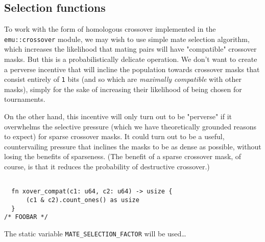 \documentclass[11pt]{article}
\begin{document}
\subsection{Selection functions}
\label{sec:org14164e5}

To work with the form of homologous crossover implemented in the
\texttt{emu::crossover} module, we may wish to use simple mate selection
algorithm, which increases the likelihood that mating pairs will
have "compatible" crossover masks. But this is a probabilistically
delicate operation. We don't want to create a perverse incentive
that will incline the population towards crossover masks that consist
entirely of \texttt{1} bits (and so which are \emph{maximally compatible} with other
masks), simply for the sake of increasing their likelihood of being
chosen for tournaments. 

On the other hand, this incentive will only turn out to be "perverse"
if it overwhelms the selective pressure (which we have theoretically
grounded reasons to expect) for sparse crossover masks. It could turn
out to be a useful, countervailing pressure that inclines the masks
to be as dense as possible, without losing the benefits of sparseness.
(The benefit of a sparse crossover mask, of course, is that it reduces
the probability of destructive crossover.)

\lstset{language=rust,label=org2a02461,caption= ,captionpos=b,numbers=none}
\begin{lstlisting}

  fn xover_compat(c1: u64, c2: u64) -> usize {
      (c1 & c2).count_ones() as usize
  }
/* FOOBAR */
\end{lstlisting}

The static variable \texttt{MATE\_SELECTION\_FACTOR} will be used\ldots{}
\end{document}
